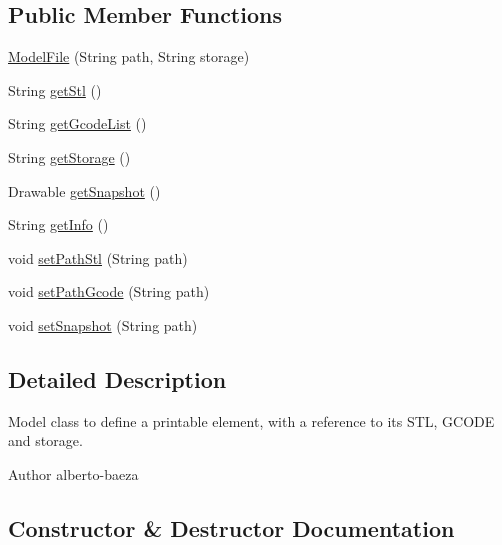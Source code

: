 \subsection*{Public Member Functions}
\begin{DoxyCompactItemize}
\item 
\hyperlink{classandroid_1_1app_1_1printerapp_1_1model_1_1_model_file_a51a9c3e9e0ff618761649dd2877b77a1}{Model\+File} (String path, String storage)
\item 
String \hyperlink{classandroid_1_1app_1_1printerapp_1_1model_1_1_model_file_ae4b7403a9632f77f75d2fff235c2c45a}{get\+Stl} ()
\item 
String \hyperlink{classandroid_1_1app_1_1printerapp_1_1model_1_1_model_file_a7875b0f3e1f35c472adfe7ddabf393cb}{get\+Gcode\+List} ()
\item 
String \hyperlink{classandroid_1_1app_1_1printerapp_1_1model_1_1_model_file_a4ea74aea82d6bd3d8071b9ccd60fb9d4}{get\+Storage} ()
\item 
Drawable \hyperlink{classandroid_1_1app_1_1printerapp_1_1model_1_1_model_file_a5d8ff6f8315fa4d422a6ad68a27a0693}{get\+Snapshot} ()
\item 
String \hyperlink{classandroid_1_1app_1_1printerapp_1_1model_1_1_model_file_a28a040d8cf68fbba86807862c256ea61}{get\+Info} ()
\item 
void \hyperlink{classandroid_1_1app_1_1printerapp_1_1model_1_1_model_file_aab93328e03cd741b09e4e467138a353c}{set\+Path\+Stl} (String path)
\item 
void \hyperlink{classandroid_1_1app_1_1printerapp_1_1model_1_1_model_file_a920209c863004760fc26721bb774903e}{set\+Path\+Gcode} (String path)
\item 
void \hyperlink{classandroid_1_1app_1_1printerapp_1_1model_1_1_model_file_a755cb49fdd17872c55793bbfaed156f4}{set\+Snapshot} (String path)
\end{DoxyCompactItemize}


\subsection{Detailed Description}
Model class to define a printable element, with a reference to its S\+TL, G\+C\+O\+DE and storage.

\begin{DoxyAuthor}{Author}
alberto-\/baeza 
\end{DoxyAuthor}


\subsection{Constructor \& Destructor Documentation}
\mbox{\label{classandroid_1_1app_1_1printerapp_1_1model_1_1_model_file_a51a9c3e9e0ff618761649dd2877b77a1}} 
